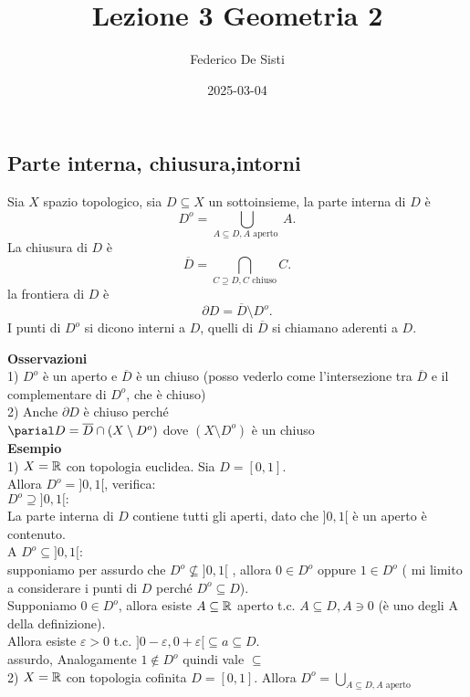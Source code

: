 \documentclass[12px]{article}
\title{Lezione 3 Geometria 2}
\date{2025-03-04}
\author{Federico De Sisti}
\begin{document}
	\maketitle
	\newpage
	\subsection{Parte interna, chiusura,intorni}
	\begin{defi}
		Sia $X$ spazio topologico, sia $D\subseteq X$ un sottoinsieme, la parte interna di  $D$ è 
		\[
		 D^o = \bigcup_{A\subseteq D, A\text{ aperto } } A
		.\] 
		La chiusura di $D$ è 
		\[
			\overline D = \bigcap_{C\supseteq D, C \text{ chiuso}} C
		.\] 
		la frontiera di $D$ è
		\[
		 \partial D = \overline D \setminus D^o
		.\] 
		I punti di $D^o$ si dicono interni a $D$, quelli di $\overline D$ si chiamano aderenti a $D$.
	\end{defi}
	\textbf{Osservazioni}\\
	1) $D^o$ è un aperto e  $\overline D$ è un chiuso (posso vederlo come l'intersezione tra  $\overline D$ e il complementare di $D^o$, che è chiuso)\\
	 2) Anche $\partial D$ è chiuso perché\\
	 $\parial D = \overline D\cap (X\setminus D^o)$ dove  $(X\setminus D^o)$ è un chiuso\\
	  \textbf{Esempio}\\
	  1) $X = \mathbb{R}$ con topologia euclidea. Sia $D = [0,1]$.\\
	  Allora  $D^o = ]0,1[$, verifica:\\
	  $D^o \supseteq ]0,1[: $\\
	  La parte interna di  $D$ contiene tutti gli aperti, dato che  $]0,1[$ è un aperto è contenuto.\\A
	  $D^o\subseteq ]0,1[$:\\
	  supponiamo per assurdo che  $D^o\not \subseteq ]0,1[$ , allora $0\in D^o$ oppure  $1\in D^o$ ( mi limito a considerare i punti di  $D$ perché $D^o\subseteq D$).\\
	  Supponiamo  $0\in D^o$, allora esiste  $A\subseteq \mathbb{R}$ aperto t.c.  $A\subseteq D, A\ni 0$ (è uno degli A della definizione).\\
	  Allora  esiste $\varepsilon > 0$ t.c.  $]0 - \varepsilon , 0 + \varepsilon[\subseteq a \subseteq D$.\\
	  assurdo, Analogamente  $1\not\in D^o$ quindi vale  $\subseteq$\\
	  2)  $X = \mathbb{R}$ con topologia cofinita $D = [0,1]$. Allora  $D^o = \bigcup_{A\subseteq D, A \text{ aperto}}$ \\
\end{document}
